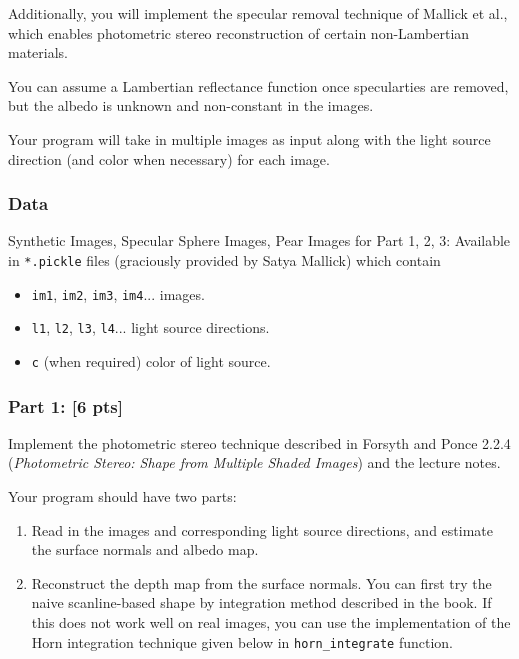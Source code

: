 \documentclass[11pt]{article}
\begin{document}
Additionally, you will implement the specular removal technique of
Mallick et al., which enables photometric stereo reconstruction of
certain non-Lambertian materials.

You can assume a Lambertian reflectance function once specularties are
removed, but the albedo is unknown and non-constant in the images.

Your program will take in multiple images as input along with the light
source direction (and color when necessary) for each image.

\subsubsection{Data}\label{data}

Synthetic Images, Specular Sphere Images, Pear Images for Part 1, 2, 3:
Available in \texttt{*.pickle} files (graciously provided by Satya
Mallick) which contain

\begin{itemize}
\item
  \texttt{im1}, \texttt{im2}, \texttt{im3}, \texttt{im4}... images.
\item
  \texttt{l1}, \texttt{l2}, \texttt{l3}, \texttt{l4}... light source
  directions.
\item
  \texttt{c} (when required) color of light source.
\end{itemize}

    \subsubsection{Part 1: {[}6 pts{]}}\label{part-1-6-pts}

Implement the photometric stereo technique described in Forsyth and
Ponce 2.2.4 (\emph{Photometric Stereo: Shape from Multiple Shaded
Images}) and the lecture notes.

Your program should have two parts:

\begin{enumerate}
\def\labelenumi{\arabic{enumi}.}
\item
  Read in the images and corresponding light source directions, and
  estimate the surface normals and albedo map.
\item
  Reconstruct the depth map from the surface normals. You can first try
  the naive scanline-based shape by integration method described in the
  book. If this does not work well on real images, you can use the
  implementation of the Horn integration technique given below in
  \texttt{horn\_integrate} function.
\end{enumerate}
\end{document}
